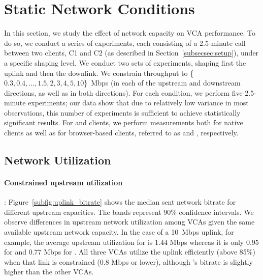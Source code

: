 \section{Static Network Conditions}\label{sec:static}

In this section, we study the effect of network capacity on VCA performance.
To do so, we conduct a series of experiments, each consisting of a 2.5-minute
call between two clients, C1 and C2 (as described in
Section~\ref{subsecsec:setup}), under a specific shaping level. We conduct two
sets of experiments, shaping first the uplink and then the downlink.  We
constrain throughput to \{$0.3, 0.4, \dots, 1.5, 2, 3, 4, 5, 10$\}~Mbps (in
each of the upstream and downstream directions, as well as in both
directions). For each condition, we perform five 2.5-minute experiments; our
data show that due to relatively low variance in most observations, this
number of experiments is sufficient to achieve statistically significant
results.  For \zoom and \teams clients, we perform measurements both for
native clients as well as for browser-based clients, referred
to as \zoombrowser and \teamsbrowser, respectively. 





\subsection{Network Utilization}
\label{subsec:network_utilization}

\paragraph{Constrained upstream utilization}: Figure~\ref{subfig:uplink_bitrate} shows the
median sent network bitrate for different upstream capacities. The bands
represent 90\% confidence intervals. We observe differences in upstream network
utilization among VCAs given the same available upstream network capacity. In
the case of a 10~Mbps uplink, for example, the average upstream utilization for
\teamsnative is $1.44$ Mbps whereas it is only $0.95$ for \meet and $0.77$
Mbps for \zoom. All three VCAs utilize the uplink efficiently (above 85\%)
when that link is constrained (0.8 Mbps or lower), although \meet's
bitrate is slightly higher than the other VCAs.  

